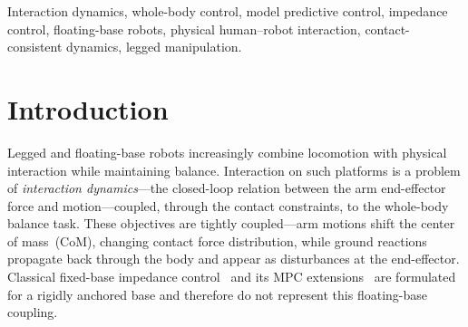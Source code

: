 \begin{abstract}
Physical human--robot interaction on floating-base robots requires
interaction regulation under changing contact constraints. We develop a
contact-consistent normalization in which the residual end-effector channel
is represented as a linear double integrator in acceleration coordinates.
Both discrete prediction matrices are independent of configuration and
support mode; posture and contact enter only through task-inertia force
recovery and constraints. The controller combines a constant-Hessian
receding-horizon QP, an acceleration-disturbance observer, and a
priority-consistent realization. Classical operational-space impedance is
shown to be the unconstrained infinite-horizon limit. MuJoCo experiments on
a 17-DOF biped and a Menagerie-derived Unitree G1 model evaluate sustained
forces, transmitted shocks, and scheduled contact-model changes. The observer
sustains near-offset-free tracking across a genuine contact-set switch and a
scheduled support-mode transition, while disturbance estimation---not contact
consistency alone---is the dominant source of fixed-stance accuracy; covariance
inflation gives only scenario-dependent transient benefit. Dynamic walking
and hardware experiments are outside the evaluated scope.
\end{abstract}

\begin{IEEEkeywords}
Interaction dynamics, whole-body control, model predictive control,
impedance control, floating-base robots, physical human--robot interaction,
contact-consistent dynamics, legged manipulation.
\end{IEEEkeywords}

\section{Introduction}

Legged and floating-base robots increasingly combine locomotion with physical
interaction while maintaining balance. Interaction on such platforms is a problem of
\emph{interaction dynamics}---the closed-loop relation between the arm
end-effector force and motion---coupled, through the contact constraints, to
the whole-body balance task.
These objectives are tightly coupled---arm motions shift the center of
mass~(CoM), changing contact force distribution, while ground reactions
propagate back through the body and appear as disturbances at the
end-effector.
Classical fixed-base impedance control~\cite{hogan1985impedance} and its
MPC extensions~\cite{cao2023passive,cao2026impedance} are formulated for a
rigidly anchored base and therefore do not represent this floating-base coupling.

